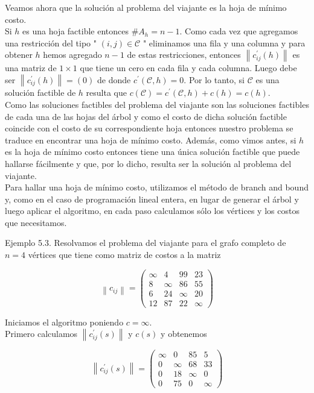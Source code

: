 \documentclass[10pt]{article}
\begin{document}
Veamos ahora que la solución al problema del viajante es la hoja de mínimo costo.\\
Si $h$ es una hoja factible entonces $\# A_{h}=n-1$. Como cada vez que agregamos una restricción del tipo " $(i, j) \in \mathcal{C}$ " eliminamos una fila y una columna y para obtener $h$ hemos agregado $n-1$ de estas restricciones, entonces $\left\|c_{i j}^{\prime}(h)\right\|$ es una matriz de $1 \times 1$ que tiene un cero en cada fila y cada columna. Luego debe ser $\left\|c_{i j}^{\prime}(h)\right\|=(0)$ de donde $c^{\prime}(\mathcal{C}, h)=0$. Por lo tanto, si $\mathcal{C}$ es una solución factible de $h$ resulta que $c(\mathcal{C})=c^{\prime}(\mathcal{C}, h)+c(h)=c(h)$.\\
Como las soluciones factibles del problema del viajante son las soluciones factibles de cada una de las hojas del árbol y como el costo de dicha solución factible coincide con el costo de su correspondiente hoja entonces nuestro problema se traduce en encontrar una hoja de mínimo costo. Además, como vimos antes, si $h$ es la hoja de mínimo costo entonces tiene una única solución factible que puede hallarse fácilmente y que, por lo dicho, resulta ser la solución al problema del viajante.\\
Para hallar una hoja de mínimo costo, utilizamos el método de branch and bound y, como en el caso de programación lineal entera, en lugar de generar el árbol y luego aplicar el algoritmo, en cada paso calculamos sólo los vértices y los costos que necesitamos.

Ejemplo 5.3. Resolvamos el problema del viajante para el grafo completo de $n=4$ vértices que tiene como matriz de costos a la matriz

$$
\left\|c_{i j}\right\|=\left(\begin{array}{cccc}
\infty & 4 & 99 & 23 \\
8 & \infty & 86 & 55 \\
6 & 24 & \infty & 20 \\
12 & 87 & 22 & \infty
\end{array}\right)
$$

Iniciamos el algoritmo poniendo $c=\infty$.\\
Primero calculamos $\left\|c_{i j}^{\prime}(s)\right\|$ y $c(s)$ y obtenemos

$$
\left\|c_{i j}^{\prime}(s)\right\|=\left(\begin{array}{cccc}
\infty & 0 & 85 & 5 \\
0 & \infty & 68 & 33 \\
0 & 18 & \infty & 0 \\
0 & 75 & 0 & \infty
\end{array}\right)
$$
\end{document}
